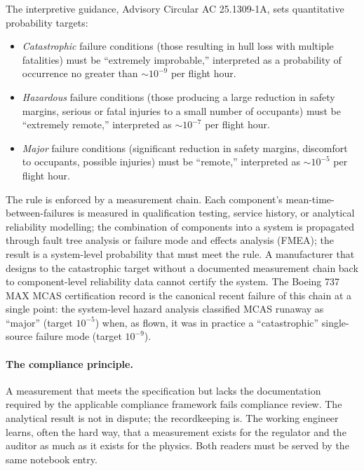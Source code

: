 The interpretive guidance, Advisory Circular AC 25.1309-1A, sets
quantitative probability targets:

\begin{itemize}[leftmargin=*]
  \item \emph{Catastrophic} failure conditions (those resulting in
    hull loss with multiple fatalities) must be ``extremely
    improbable,'' interpreted as a probability of occurrence no
    greater than $\sim 10^{-9}$ per flight hour.
  \item \emph{Hazardous} failure conditions (those producing a
    large reduction in safety margins, serious or fatal injuries
    to a small number of occupants) must be ``extremely remote,''
    interpreted as $\sim 10^{-7}$ per flight hour.
  \item \emph{Major} failure conditions (significant reduction in
    safety margins, discomfort to occupants, possible injuries)
    must be ``remote,'' interpreted as $\sim 10^{-5}$ per flight
    hour.
\end{itemize}

The rule is enforced by a measurement chain. Each component's
mean-time-between-failures is measured in qualification testing,
service history, or analytical reliability modelling; the
combination of components into a system is propagated through fault
tree analysis or failure mode and effects analysis (FMEA); the
result is a system-level probability that must meet the rule. A
manufacturer that designs to the catastrophic target without a
documented measurement chain back to component-level reliability
data cannot certify the system. The Boeing 737 MAX MCAS
certification record is the canonical recent failure of this chain
at a single point: the system-level hazard analysis classified MCAS
runaway as ``major'' (target $10^{-5}$) when, as flown, it was in
practice a ``catastrophic'' single-source failure mode (target
$10^{-9}$).

\paragraph{The compliance principle.} A measurement that meets the
specification but lacks the documentation required by the
applicable compliance framework fails compliance review. The
analytical result is not in dispute; the recordkeeping is. The
working engineer learns, often the hard way, that a measurement
exists for the regulator and the auditor as much as it exists for
the physics. Both readers must be served by the same notebook
entry.

